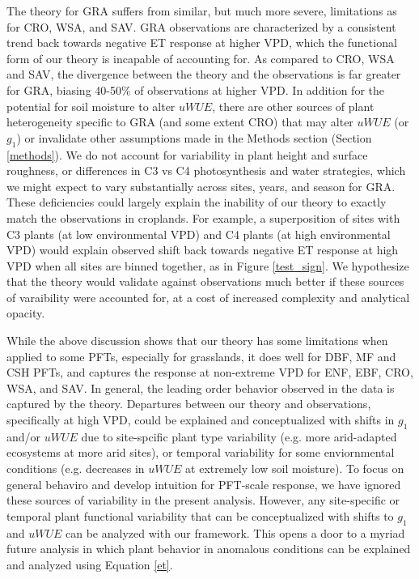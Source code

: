 \documentclass[draft,linenumbers]{agujournal}
\begin{document}
The theory for GRA suffers from similar, but much more severe, limitations as for CRO, WSA, and SAV. GRA observations are characterized by a consistent trend back towards negative ET response at higher VPD, which the functional form of our theory is incapable of accounting for. As compared to CRO, WSA and SAV, the divergence between the theory and the observations is far greater for GRA, biasing 40-50\% of observations at higher VPD. In addition for the potential for soil moisture to alter $uWUE$, there are other sources of plant heterogeneity specific to GRA (and some extent CRO) that may alter $uWUE$ (or $g_1$) or invalidate other assumptions made in the Methods section (Section \ref{methods}). We do not account for variability in plant height and surface roughness, or differences in C3 vs C4 photosynthesis and water strategies, which we might expect to vary substantially across sites, years, and season for GRA. These deficiencies could largely explain the inability of our theory to exactly match the observations in croplands. For example, a superposition of sites with C3 plants (at low environmental VPD) and C4 plants (at high environmental VPD) would explain observed shift back towards negative ET response at high VPD when all sites are binned together, as in Figure \ref{test_sign}. We hypothesize that the theory would validate against observations much better if these sources of varaibility were accounted for, at a cost of increased complexity and analytical opacity. 


While the above discussion shows that our theory has some limitations when applied to some PFTs, especially for grasslands, it does well for DBF, MF and CSH PFTs, and captures the response at non-extreme VPD for ENF, EBF, CRO, WSA, and SAV. In general, the leading order behavior observed in the data is captured by the theory. Departures between our theory and observations, specifically at high VPD, could be explained and conceptualized with shifts in $g_1$ and/or $uWUE$ due to site-spcific plant type variability (e.g. more arid-adapted ecosystems at more arid sites), or temporal variability for some enviornmental conditions (e.g. decreases in $uWUE$ at extremely low soil moisture). To focus on general behaviro and develop intuition for PFT-scale response, we have ignored these sources of variability in the present analysis. However, any site-specific or temporal plant functional variability that can be conceptualized with shifts to $g_1$ and $uWUE$ can be analyzed with our framework. This opens a door to a myriad future analysis in which plant behavior in anomalous conditions can be explained and analyzed using Equation \ref{et}.
\end{document}
